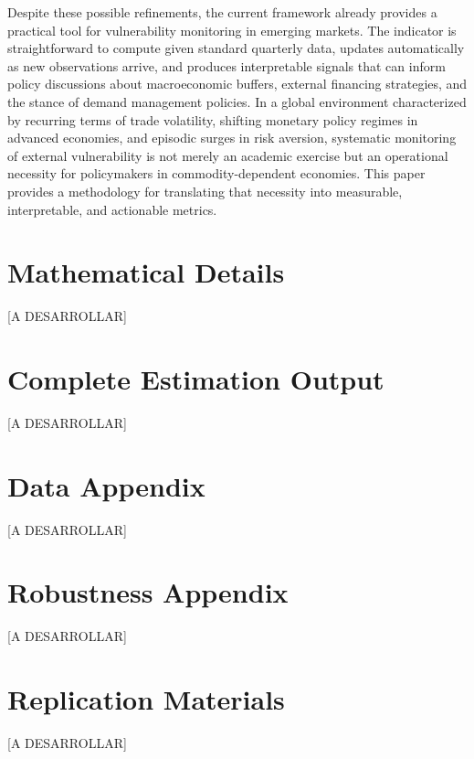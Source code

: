 \documentclass[12pt,a4paper]{article}
\numberwithin{equation}{section}
\theoremstyle{definition}
\theoremstyle{remark}
\begin{document}
Despite these possible refinements, the current framework already provides a practical tool for vulnerability monitoring in emerging markets. The indicator is straightforward to compute given standard quarterly data, updates automatically as new observations arrive, and produces interpretable signals that can inform policy discussions about macroeconomic buffers, external financing strategies, and the stance of demand management policies. In a global environment characterized by recurring terms of trade volatility, shifting monetary policy regimes in advanced economies, and episodic surges in risk aversion, systematic monitoring of external vulnerability is not merely an academic exercise but an operational necessity for policymakers in commodity-dependent economies. This paper provides a methodology for translating that necessity into measurable, interpretable, and actionable metrics.




\printbibliography



\appendix

\section{Mathematical Details}
\label{app:math}

[A DESARROLLAR]

\section{Complete Estimation Output}
\label{app:estimation}

[A DESARROLLAR]

\section{Data Appendix}
\label{app:data}

[A DESARROLLAR]

\section{Robustness Appendix}
\label{app:robustness}

[A DESARROLLAR]

\section{Replication Materials}
\label{app:replication}

[A DESARROLLAR]
\end{document}
